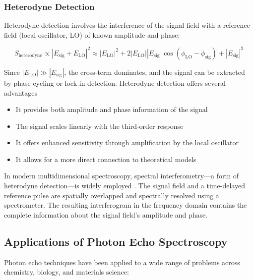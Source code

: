 \subsubsection{Heterodyne Detection}
\label{subsubsec:heterodyne}

\noindent Heterodyne detection involves the interference of the signal field with a reference field (local oscillator, LO) of known amplitude and phase:

\begin{equation}
	S_{\text{heterodyne}} \propto |E_{\text{sig}} + E_{\text{LO}}|^2 \approx |E_{\text{LO}}|^2 + 2|E_{\text{LO}}||E_{\text{sig}}|\cos(\phi_{\text{LO}} - \phi_{\text{sig}}) + |E_{\text{sig}}|^2
	\label{eq:heterodyne}
\end{equation}

\noindent Since $|E_{\text{LO}}| \gg |E_{\text{sig}}|$, the cross-term dominates, and the signal can be extracted by phase-cycling or lock-in detection. Heterodyne detection offers several advantages %

\begin{itemize}
	\item It provides both amplitude and phase information of the signal
	\item The signal scales linearly with the third-order response
	\item It offers enhanced sensitivity through amplification by the local oscillator
	\item It allows for a more direct connection to theoretical models
\end{itemize}

\noindent In modern multidimensional spectroscopy, spectral interferometry—a form of heterodyne detection—is widely employed \cite{hybletal1998twodimensionalelectronicspectroscopy}. The signal field and a time-delayed reference pulse are spatially overlapped and spectrally resolved using a spectrometer. The resulting interferogram in the frequency domain contains the complete information about the signal field's amplitude and phase.

\subsection{Applications of Photon Echo Spectroscopy}
\label{subsec:echo_applications}

\noindent Photon echo techniques have been applied to a wide range of problems across chemistry, biology, and materials science:

